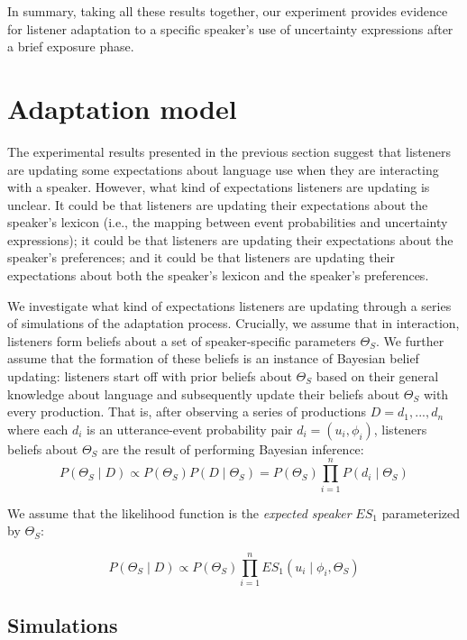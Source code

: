 \documentclass[lucida,biblatex]{sp} %
\begin{document}
In summary, taking all these results together, our experiment provides evidence for listener adaptation to a specific speaker's use of uncertainty expressions after a brief exposure phase.

% 

\section{Adaptation model}
\label{sec:model-adapt}

The experimental results presented in the previous section suggest that listeners are updating some expectations about language use when they are interacting with a speaker. 
However, what kind of expectations listeners are updating is unclear. It could be that listeners are updating their expectations about the speaker's lexicon 
(i.e., the mapping between event probabilities and uncertainty expressions); it could be that listeners are updating their expectations about the speaker's preferences; and
it could be that listeners are updating their expectations about both the speaker's lexicon and the speaker's preferences.

We investigate what kind of expectations listeners are updating through a series of simulations of the adaptation process. Crucially, we assume that in interaction,
listeners form beliefs about a set of speaker-specific parameters $\Theta_S$. 
We further assume that the formation of these beliefs is an instance of Bayesian belief updating:
listeners start off with prior beliefs about $\Theta_S$ based on their general knowledge about 
language and subsequently update their beliefs about $\Theta_S$ with every production. 
That is, after observing a series of productions $D={d_1, ..., d_n}$ where each $d_i$ is an 
utterance-event probability pair $d_i = (u_i, \phi_i)$, listeners beliefs about $\Theta_S$ are the result
of performing Bayesian inference:
$$P(\Theta_S \mid D) \propto P(\Theta_S) P(D \mid \Theta_S) = P(\Theta_S) \prod_{i=1}^nP(d_i \mid \Theta_S) $$

\noindent We assume that the likelihood function is the \textit{expected speaker} $ES_1$ parameterized by $\Theta_S$:

$$P(\Theta_S \mid D) \propto P(\Theta_S)  \prod_{i=1}^n ES_1(u_i \mid \phi_i, \Theta_S) $$



\subsection{Simulations}
\end{document}
